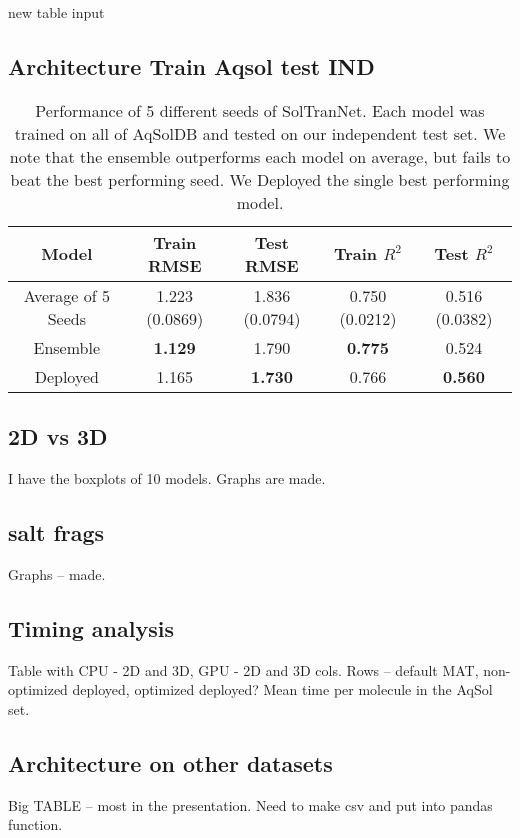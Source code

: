 \documentclass[journal=jmcmar,manuscript=article]{achemso}
\begin{document}
new table input

\subsection{Architecture Train Aqsol test IND}

\begin{table}
    \begin{tabular}{|c|c|c|c|c|}
        Model & Train RMSE & Test RMSE & Train $R^2$ & Test $R^2$ \\
        \hline
        Average of 5 Seeds & 1.223 (0.0869) & 1.836 (0.0794)  & 0.750 (0.0212) & 0.516 (0.0382)\\
        Ensemble & \textbf{1.129} & 1.790 & \textbf{0.775} & 0.524\\
        Deployed & 1.165 & \textbf{1.730} & 0.766 & \textbf{0.560}\\
        \hline
    \end{tabular}
    \caption{Performance of 5 different seeds of SolTranNet. Each model was trained on all of AqSolDB and tested on our independent test set. We note that the ensemble outperforms each model on average, but fails to beat the best performing seed. We Deployed the single best performing model.}
    \label{tab:deployed}
\end{table}

\subsection{2D vs 3D}
I have the boxplots of 10 models. Graphs are made.

\subsection{salt frags}
Graphs -- made.

\subsection{Timing analysis}
Table with CPU - 2D and 3D, GPU - 2D and 3D cols. Rows -- default MAT, non-optimized deployed, optimized deployed?
Mean time per molecule in the AqSol set.

\subsection{Architecture on other datasets}
Big TABLE -- most in the presentation. Need to make csv and put into pandas function.
\end{document}
